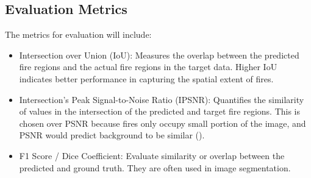 \documentclass[a4paper, 11pt]{article}
\begin{document}
\begin{table}[h]
\centering
\caption{Summary of Experimental Configurations}
\label{tab:experiments}
\end{table}

\subsection{Evaluation Metrics}
The metrics for evaluation will include:
\begin{itemize}
    \item Intersection over Union (IoU): Measures the overlap between the predicted fire regions and the actual fire regions in the target data. Higher IoU indicates better performance in capturing the spatial extent of fires.
    \item Intersection's Peak Signal-to-Noise Ratio (IPSNR): Quantifies the similarity of values in the intersection of the predicted and target fire regions. This is chosen over PSNR because fires only occupy small portion of the image, and PSNR would predict background to be similar (\cite{badhanDeepLearningApproach2024}).
    \item F1 Score / Dice Coefficient: Evaluate similarity or overlap between the predicted and ground truth. They are often used in image segmentation.
\end{itemize}
\end{document}
